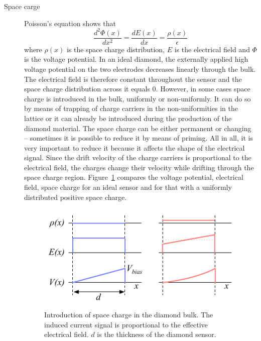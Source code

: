 \begin{description}
\item[Space carge] 
Poisson's equation shows that 
\begin{equation}
\label{eq:poisson}
\frac{d^2\Phi(x)}{dx^2} = \frac{dE(x)}{dx} = \frac{\rho(x)}{\epsilon}
\end{equation}
where $\rho(x)$ is the space charge distribution, $E$ is the electrical field and $\Phi$ is the voltage potential. In an ideal diamond, the externally applied high voltage potential on the two electrodes decreases linearly through the bulk. The electrical field is therefore constant throughout the sensor and the space charge distribution across it equals 0. However, in some cases space charge is introduced in the bulk, uniformly or non-uniformly. It can do so by means of trapping of charge carriers in the non-uniformities in the lattice or it can already be introduced during the production of the diamond material. The space charge can be either permanent or changing -- sometimes it is possible to reduce it by means of priming. All in all, it is very important to reduce it because it affects the shape of the electrical signal. Since the drift velocity of the charge carriers is proportional to the electrical field, the charges change their velocity while drifting through the space charge region. Figure~\ref{fig:spcchg} compares the voltage potential, electrical field, space charge for an ideal sensor and for that with a uniformly distributed positive space charge.
\begin{figure}[!t]
\begin{center}
\includegraphics[width=0.6\linewidth]{02_pulse_formation/pics/plots/spcchg}
\caption{Introduction of space charge in the diamond bulk. The induced current signal is proportional to the effective electrical field. $d$ is the thickness of the diamond sensor.}
\label{fig:spcchg}
\end{center}
\end{figure}



\end{description}
